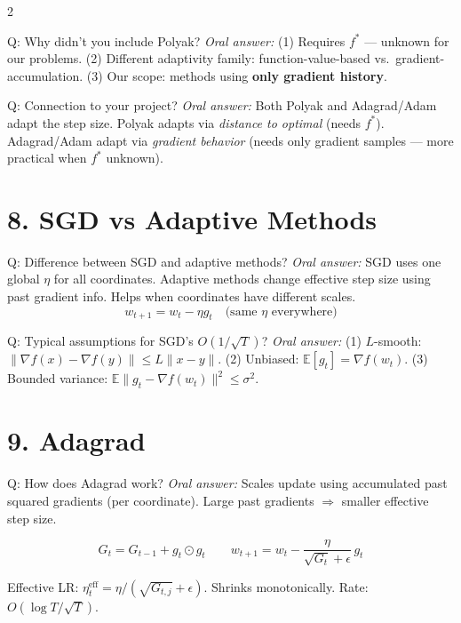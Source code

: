\documentclass[a4paper,9pt]{article}
\newcommand{\oral}{\textit{\color{darkgray}Oral answer: }}
\begin{document}
\begin{multicols}{2}
\begin{qa}{Q: Why didn't you include Polyak?}
\oral (1) Requires \(f^*\) --- unknown for our problems.
(2) Different adaptivity family: function-value-based vs.\ gradient-accumulation.
(3) Our scope: methods using \textbf{only gradient history}.
\end{qa}

\begin{qa}{Q: Connection to your project?}
\oral Both Polyak and Adagrad/Adam adapt the step size. 
Polyak adapts via \emph{distance to optimal} (needs \(f^*\)). 
Adagrad/Adam adapt via \emph{gradient behavior} (needs only gradient samples --- more practical when \(f^*\) unknown).
\end{qa}

\section{8. SGD vs Adaptive Methods}

\begin{qa}{Q: Difference between SGD and adaptive methods?}
\oral SGD uses one global \(\eta\) for all coordinates. 
Adaptive methods change effective step size using past gradient info. 
Helps when coordinates have different scales.
\[
w_{t+1} = w_t-\eta g_t \quad \text{(same \(\eta\) everywhere)}
\]
\end{qa}

\begin{qa}{Q: Typical assumptions for SGD's \(O(1/\sqrt{T})\)?}
\oral (1) \(L\)-smooth: \(\|\nabla f(x)-\nabla f(y)\| \leq L\|x-y\|\).
(2) Unbiased: \(\mathbb{E}[g_t]=\nabla f(w_t)\).
(3) Bounded variance: \(\mathbb{E}\|g_t-\nabla f(w_t)\|^2 \leq \sigma^2\).
\end{qa}

\section{9. Adagrad}

\begin{qa}{Q: How does Adagrad work?}
\oral Scales update using accumulated past squared gradients (per coordinate).
Large past gradients \(\Rightarrow\) smaller effective step size.

\[
G_t = G_{t-1} + g_t \odot g_t
\qquad
w_{t+1} = w_t - \frac{\eta}{\sqrt{G_t}+\epsilon}\, g_t
\]

Effective LR: \(\eta_t^{\text{eff}} = \eta/(\sqrt{G_{t,j}}+\epsilon)\). Shrinks monotonically.
Rate: \(O(\log T/\sqrt{T})\).
\end{qa}


\end{multicols}
\end{document}
